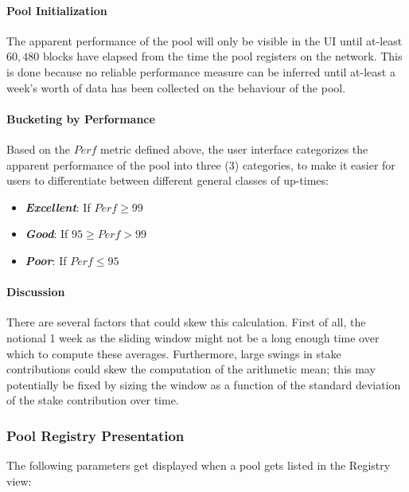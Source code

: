 \paragraph*{Pool Initialization} The apparent performance of the pool will only be visible in the UI until at-least $60,480$ blocks have elapsed from the time the pool registers on the network. This is done because no reliable performance measure can be inferred until at-least a week's worth of data has been collected on the behaviour of the pool. 

\paragraph*{Bucketing by Performance} Based on the $Perf$ metric defined above, the user interface categorizes the apparent performance of the pool into three (3) categories, to make it easier for users to differentiate between different general classes of up-times:

\begin{itemize}[nosep, label=--]
    \item \textit{\textbf{Excellent}}: If $Perf \geq 99$
    \item \textit{\textbf{Good}}: If $95 \geq Perf > 99$ 
    \item \textit{\textbf{Poor}}: If $Perf \leq 95$  
\end{itemize}

\paragraph*{Discussion} There are several factors that could skew this calculation. First of all, the notional 1 week as the sliding window might not be a long enough time over which to compute these averages. Furthermore, large swings in stake contributions could skew the computation of the arithmetic mean; this may potentially be fixed by sizing the window as a function of the standard deviation of the stake contribution over time. 

\subsubsection{Pool Registry Presentation}

The following parameters get displayed when a pool gets listed in the Registry view: 

